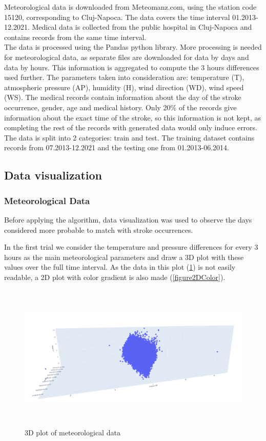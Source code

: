 \documentclass{article}
\begin{document}
Meteorological data is downloaded from Meteomanz.com, using the station code 15120, corresponding to Cluj-Napoca. The data covers the time interval 01.2013-12.2021. Medical data is collected from the public hospital in Cluj-Napoca and contains records from the same time interval.
\\

The data is processed using the Pandas python library. More processing is needed for meteorological data, as separate files are downloaded for data by days and data by hours. This information is aggregated to compute the 3 hours differences used further. The parameters taken into consideration are: temperature (T), atmospheric pressure (AP), humidity (H), wind direction
(WD), wind speed (WS). The medical records contain information about the day of the stroke occurrence, gender, age and medical history. Only 20\% of the records give information about the exact time of the stroke, so this information is not kept, as completing the rest of the records with generated data would only induce errors. The data is split into 2 categories: train and test. The training dataset contains records from 07.2013-12.2021 and the testing one from 01.2013-06.2014. 

\subsection{Data visualization}

\subsubsection{Meteorological Data}

Before applying the algorithm, data visualization was used to observe the days considered more probable to match with stroke occurrences. 

In the first trial we consider the temperature and pressure differences for every 3 hours as the main meteorological parameters and draw a 3D plot with these values over the full time interval. As the data in this plot (\ref{figure3D}) is not easily readable, a 2D plot with color gradient is also made (\ref{figure2DColor}). 

\begin{figure}[ht] 
\centering
\includegraphics[height=7cm]{3dPlot.png} 
\caption{3D plot of meteorological data}
\label{figure3D}
\end{figure}
\end{document}
